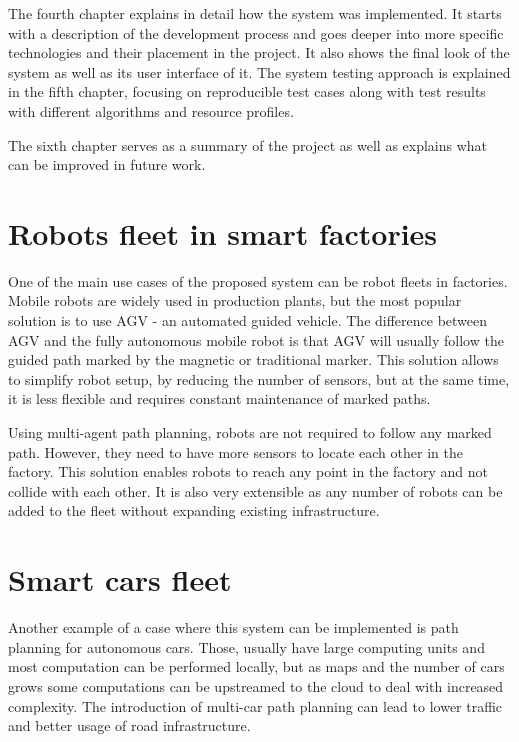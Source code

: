The fourth chapter explains in detail how the system was implemented. It starts with a description of the development process and goes deeper into more specific technologies and their placement in the project. It also shows the final look of the system as well as its user interface of it. The system testing approach is explained in the fifth chapter, focusing on reproducible test cases along with test results with different algorithms and resource profiles.

The sixth chapter serves as a summary of the project as well as explains what can be improved in future work.

\section{Robots fleet in smart factories}
One of the main use cases of the proposed system can be robot fleets in factories. Mobile robots are widely used in production plants, but the most popular solution is to use AGV - an automated guided vehicle\cite{agv}. The difference between AGV and the fully autonomous mobile robot is that AGV will usually follow the guided path marked by the magnetic or traditional marker. This solution allows to simplify robot setup, by reducing the number of sensors, but at the same time, it is less flexible and requires constant maintenance of marked paths.

Using multi-agent path planning, robots are not required to follow any marked path. However, they need to have more sensors to locate each other in the factory. This solution enables robots to reach any point in the factory and not collide with each other. It is also very extensible as any number of robots can be added to the fleet without expanding existing infrastructure.

\section{Smart cars fleet}

Another example of a case where this system can be implemented is path planning for autonomous cars. Those, usually have large computing units and most computation can be performed locally, but as maps and the number of cars grows some computations can be upstreamed to the cloud to deal with increased complexity. The introduction of multi-car path planning can lead to lower traffic and better usage of road infrastructure.